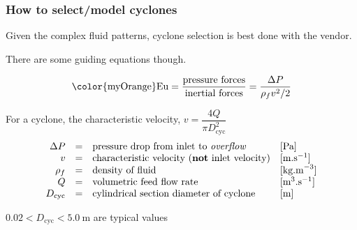 \begin{frame}\frametitle{How to select/model cyclones}
	{\color{myOrange}Given the complex fluid patterns, cyclone selection is best done with the vendor.}
	
	\vspace{12pt}
	There are some guiding equations though.
	\begin{exampleblock}{}
		\[\text{{\color{myOrange}Eu}} = \dfrac{\text{pressure forces}}{\text{inertial forces}} = \dfrac{\Delta P}{\rho_f v^2 / 2}\]
	\end{exampleblock}
	
	\vspace{12pt}
	For a cyclone, the characteristic velocity, {\color{blue}$v = \dfrac{4Q}{\pi D_\text{cyc}^2}$ }
	\[
		\begin{array}{rcll}
			\Delta P&=& \text{pressure drop from inlet to \emph{overflow}} 				&[\text{Pa}]\\
			v 	    &=& \text{characteristic velocity (\textbf{not} inlet velocity)}  	&[\text{m.s}^{-1}]\\
			\rho_f  &=& \text{density of fluid}  										&[\text{kg.m}^{-3}]\\
			Q   	&=& \text{volumetric feed flow rate}								&[\text{m}^{3}\text{.s}^{-1}]\\
			D_\text{cyc}&=& \text{cylindrical section diameter of cyclone}				&[\text{m}] \\
		\end{array}
	\]
	
	\vspace{12pt}
	$0.02 < D_\text{cyc} < 5.0~\text{m}$ are typical values
	
\end{frame}


